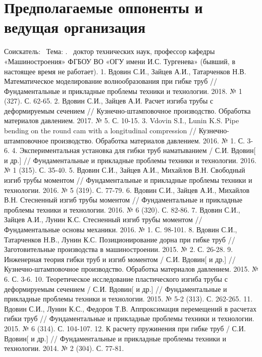 
\section{Предполагаемые оппоненты и ведущая организация}


Соискатель: \thesisAuthorShort\ 
Тема: \thesisTitle.
\opponentOneFio\
доктор технических наук, профессор кафедры «Машиностроения» ФГБОУ ВО «ОГУ имени И.С. Тургенева» (бывший, в настоящее время не работает).
1. Вдовин С.И., Зайцев А.И., Татарченков Н.В. Математическое моделирование волнообразования при гибке труб // Фундаментальные и прикладные проблемы техники и технологии. 2018. № 1 (327). С. 62-65.
2. Вдовин С.И., Зайцев А.И. Расчет изгиба трубы с деформируемым сечением // Кузнечно-штамповочное производство. Обработка материалов давлением. 2017. № 5. С. 10-15.
3. Vdovin S.I., Lunin K.S. Pipe bending on the round cam with a longitudinal compression // Кузнечно-штамповочное производство. Обработка материалов давлением. 2016. № 1. С. 3-6.	
4. Экспериментальная установка для гибки труб наматыванием / С.И. Вдовин[ и др.] // Фундаментальные и прикладные проблемы техники и технологии. 2016. № 1 (315). С. 35-40.
5. Вдовин С.И., Зайцев А.И., Михайлов В.Н. Свободный изгиб трубы моментом // Фундаментальные и прикладные проблемы техники и технологии. 2016. № 5 (319). С. 77-79.
6. Вдовин С.И., Зайцев А.И., Михайлов В.Н. Стесненный изгиб трубы моментом // Фундаментальные и прикладные проблемы техники и технологии. 2016. № 6 (320). С. 82-86.
7. Вдовин С.И., Зайцев А.И., Лунин К.С. Стесненный изгиб трубы моментом // Фундаментальные основы механики. 2016. № 1. С. 98-101.
8. Вдовин С.И., Татарченков Н.В., Лунин К.С. Позиционирование дорна при гибке труб // Заготовительные производства в машиностроении. 2015. № 2. С. 26-28.
9. Инженерная теория гибки труб и изгиб моментом / С.И. Вдовин[ и др.] // Кузнечно-штамповочное производство. Обработка материалов давлением. 2015. 
№ 6. С. 3-6.	
10. Теоретическое исследование пластического изгиба трубы с деформируемым сечением / С.И. Вдовин[ и др.] // Фундаментальные и прикладные проблемы техники и технологии. 2015. № 5-2 (313). С. 262-265.
11. Вдовин С.И., Лунин К.С., Федоров Т.В. Аппроксимация перемещений в расчетах гибки труб // Фундаментальные и прикладные проблемы техники и технологии. 2015. № 6 (314). С. 104-107.	
12. К расчету пружинения при гибке труб / С.И. Вдовин[ и др.] // Фундаментальные и прикладные проблемы техники и технологии. 2014. № 2 (304). С. 77-81.

